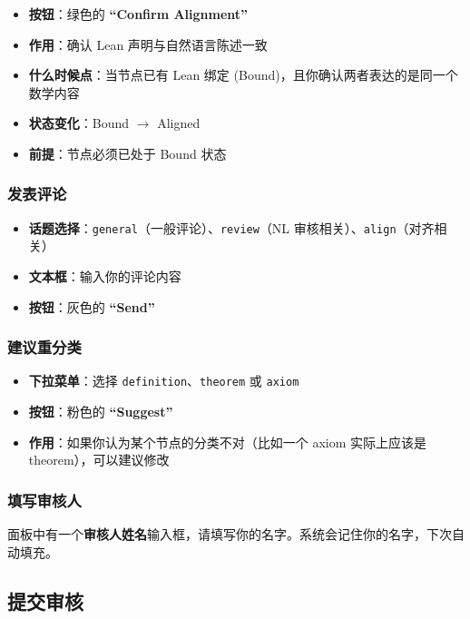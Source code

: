 \documentclass[11pt,a4paper]{article}
\begin{document}
\begin{itemize}[nosep]
  \item \textbf{按钮}：绿色的 \textbf{``Confirm Alignment''}
  \item \textbf{作用}：确认 Lean 声明与自然语言陈述一致
  \item \textbf{什么时候点}：当节点已有 Lean 绑定 (Bound)，且你确认两者表达的是同一个数学内容
  \item \textbf{状态变化}：Bound $\to$ Aligned
  \item \textbf{前提}：节点必须已处于 Bound 状态
\end{itemize}

\subsubsection*{发表评论}

\begin{itemize}[nosep]
  \item \textbf{话题选择}：\texttt{general}（一般评论）、\texttt{review}（NL 审核相关）、\texttt{align}（对齐相关）
  \item \textbf{文本框}：输入你的评论内容
  \item \textbf{按钮}：灰色的 \textbf{``Send''}
\end{itemize}

\subsubsection*{建议重分类}

\begin{itemize}[nosep]
  \item \textbf{下拉菜单}：选择 \texttt{definition}、\texttt{theorem} 或 \texttt{axiom}
  \item \textbf{按钮}：粉色的 \textbf{``Suggest''}
  \item \textbf{作用}：如果你认为某个节点的分类不对（比如一个 axiom 实际上应该是 theorem），可以建议修改
\end{itemize}

\subsubsection*{填写审核人}

面板中有一个\textbf{审核人姓名}输入框，请填写你的名字。系统会记住你的名字，下次自动填充。

\subsection{提交审核}
\end{document}
